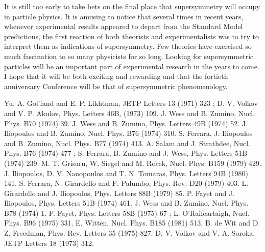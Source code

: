 \documentclass[a4paper,11pt]{article}
\begin{document}
It is still too early to take bets on the final place that
supersymmetry will occupy in particle physics. It is amusing  to
notice that several times in recent years, whenever experimental results 
appeared to depart from the Standard Model predictions, the first
reaction of both theorists and experimentalists  was to try to 
interpret them as indications of supersymmetry. Few theories have
exercised so much fascination to so many physicists for so long. Looking for supersymmetric
particles will be an important part of experimental research in the
years to come. I hope that it will be both exciting and rewarding and
that the fortieth anniversary Conference will be that of
supersymmetric phenomenology.     



 




\vskip2cm

\begin{thebibliography}{99}
 Yu. A. Gol'fand and E. P. Likhtman, JETP Letters 13 (1971) 323 ; D. V. Volkov and V. P. Akulov, Phys. Letters 46B, (1973) 109.
 J. Wess and B. Zumino, Nucl. Phys. B70 (1974) 39.
 J. Wess and B. Zumino, Phys. Letters 49B (1974) 52.
 J. Iliopoulos and B. Zumino, Nucl. Phys. B76 (1974) 310.
 S. Ferrara, J. Iliopoulos and B. Zumino, Nucl. Phys. B77 (1974) 413.
 A. Salam and J. Strathdee, Nucl. Phys. B76 (1974) 477 ; S. Ferrara, B. Zumino and J. Wess, Phys. Letters 51B (1974) 239.
 M. T. Grisaru, W. Siegel and M. Ro$\check{c}$ek, Nucl. Phys. B159 (1979) 429.
 J. Iliopoulos, D. V. Nanopoulos and T. N. Tomaras, Phys. Letters 94B (1980) 141.
 S. Ferrara, N. Girardello and F. Palumbo, Phys. Rev. D20 (1979) 403.
 L. Girardello and J. Iliopoulos, Phys. Letters 88B (1979) 85.
 P. Fayet and J. Iliopoulos, Phys. Letters 51B (1974) 461.
 J. Wess and B. Zumino, Nucl. Phys. B78 (1974) 1.
 P. Fayet, Phys. Letters 58B (1975) 67 ;
L. O'Raifeartaigh, Nucl. Phys. B96 (1975) 331.
 E. Witten, Nucl. Phys. B185 (1981) 513.
 B. de Wit and D. Z. Freedman, Phys. Rev. Letters 35
(1975) 827.
 D. V. Volkov and V. A. Soroka, JETP Letters 18 (1973) 312.

\end{thebibliography}
\end{document}
